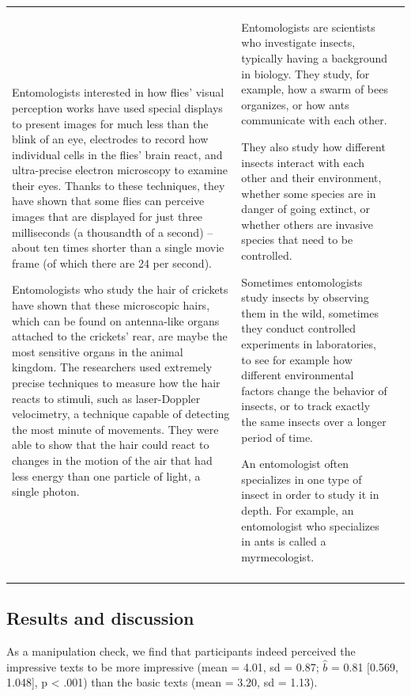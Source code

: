 \documentclass[
  doc,floatsintext]{apa6}
\begin{document}
\begin{longtable}[t]{>{\raggedright\arraybackslash}p{5em}>{\raggedright\arraybackslash}p{25em}>{\raggedright\arraybackslash}p{25em}}
Entomologists interested in how flies’ visual perception works have used special displays to present images for much less than the blink of an eye, electrodes to record how individual cells in the flies’ brain react, and ultra-precise electron microscopy to examine their eyes. Thanks to these techniques, they have shown that some flies can perceive images that are displayed for just three milliseconds (a thousandth of a second) – about ten times shorter than a single movie frame (of which there are 24 per second). 

Entomologists who study the hair of crickets have shown that these microscopic hairs, which can be found on antenna-like organs attached to the crickets’ rear, are maybe the most sensitive organs in the animal kingdom. The researchers used extremely precise techniques to measure how the hair reacts to stimuli, such as laser-Doppler velocimetry, a technique capable of detecting the most minute of movements. They were able to show that the hair could react to changes in the motion of the air that had less energy than one particle of light, a single photon. & Entomologists are scientists who investigate insects, typically having a background in biology. They study, for example, how a swarm of bees organizes, or how ants communicate with each other. 

They also study how different insects interact with each other and their environment, whether some species are in danger of going extinct, or whether others are invasive species that need to be controlled.

Sometimes entomologists study insects by observing them in the wild, sometimes they conduct controlled experiments in laboratories, to see for example how different environmental factors change the behavior of insects, or to track exactly the same insects over a longer period of time.

An entomologist often specializes in one type of insect in order to study it in depth. For example, an entomologist who specializes in ants is called a myrmecologist.\\*
\end{longtable}
\endgroup{}

\subsection{Results and discussion}\label{results-and-discussion}

As a manipulation check, we find that participants indeed perceived the impressive texts to be more impressive (mean = 4.01, sd = 0.87; \(\hat{b}\) = 0.81 {[}0.569, 1.048{]}, p \textless{} .001) than the basic texts (mean = 3.20, sd = 1.13).
\end{document}
